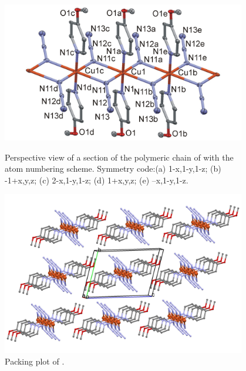 \begin{figure}[!htpb]
\centering
\includegraphics[width=0.95\textwidth]{figures/CuA4MOP_FIGm12.png}
\caption[Perspective view of ]{Perspective view of a section of the polymeric chain of  with the atom numbering scheme. Symmetry code:(a) 1-x,1-y,1-z; (b) -1+x,y,z; (c) 2-x,1-y,1-z; (d) 1+x,y,z; 
(e) –x,1-y,1-z.}
\label{fig:CuA4MOP_pv}
\vspace{\floatsep}
\includegraphics[width=0.95\textwidth]{figures/CuA4MOP_CA.png}
\caption{Packing plot  of .}
\label{fig:CuA4MOP_packv}
\end{figure}


